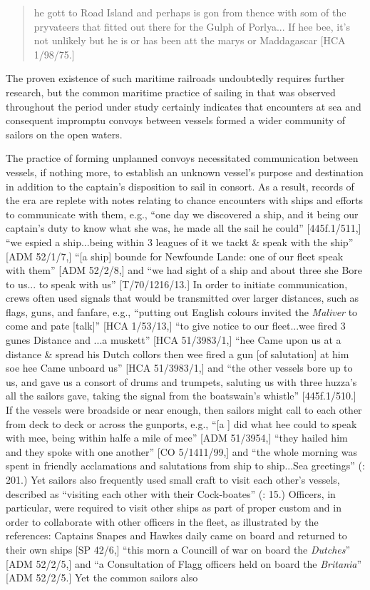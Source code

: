 \begin{quotation}
he gott to Road Island and perhaps is gon from thence with som of the pryvateers that fitted out there for the Gulph of Porlya... If hee bee, it’s not unlikely but he is or has been att the marys or Maddagascar [HCA 1/98/75.] 
\end{quotation}

The proven existence of such maritime railroads undoubtedly requires further research, but the common maritime practice of sailing in  that was observed throughout the period under study certainly indicates that encounters at sea and consequent impromptu convoys between vessels formed a wider community of sailors on the open waters. 

The practice of forming unplanned convoys necessitated communication between vessels, if nothing more, to establish an unknown vessel’s purpose and destination in addition to the captain’s disposition to sail in consort. As a result, records of the era are replete with notes relating to chance encounters with ships and efforts to communicate with them, e.g., “one day we discovered a ship, and it being our captain’s duty to know what she was, he made all the sail he could” [445f.1/511,] “we espied a ship...being within 3 leagues of it we tackt \& speak with the ship” [ADM 52/1/7,] “[a ship] bounde for Newfounde Lande: one of our fleet speak with them” [ADM 52/2/8,] and “we had sight of a ship and about three she Bore to us... to speak with us” [T/70/1216/13.] In order to initiate communication, crews often used signals that would be transmitted over larger distances, such as flags, guns, and fanfare, e.g., “putting out English colours invited the \textit{Maliver} to come and pate [talk]” [HCA 1/53/13,] “to give notice to our fleet...wee fired 3 gunes Distance and ...a muskett” [HCA 51/3983/1,] “hee Came upon us at a distance \& spread his Dutch collors then wee fired a gun [of salutation] at him soe hee Came unboard us” [HCA 51/3983/1,] and “the other vessels bore up to us, and gave us a consort of drums and trumpets, saluting us with three huzza’s all the sailors gave, taking the signal from the boatswain’s whistle”  [445f.1/510.] If the vessels were broadside or near enough, then sailors might call to each other from deck to deck or across the gunports, e.g., “[a ] did what hee could to speak with mee, being within halfe a mile of mee” [ADM 51/3954,] “they hailed him and they spoke with one another” [CO 5/1411/99,] and “the whole morning was spent in friendly acclamations and salutations from ship to ship...Sea greetings” (\citealt{Gage1648}: 201.) Yet sailors also frequently used small craft to visit each other’s vessels, described as “visiting each other with their Cock-boates” (\citealt{Gage1648}: 15.)  Officers, in particular, were required to visit other ships as part of proper custom and in order to collaborate with other officers in the fleet, as illustrated by the references: Captains Snapes and Hawkes daily came on board and returned to their own ships [SP 42/6,] “this morn a Councill of war on board the \textit{Dutches}” [ADM 52/2/5,] and “a Consultation of Flagg officers held on board the \textit{Britania}” [ADM 52/2/5.] Yet the common sailors also 
